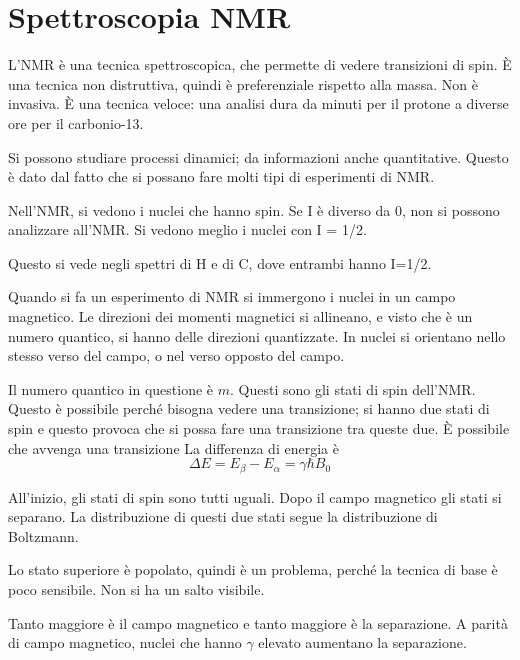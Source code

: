 \chapter{Spettroscopia NMR}

L'NMR è una tecnica spettroscopica, che permette di vedere transizioni di spin. È una tecnica non distruttiva,
quindi è preferenziale rispetto alla massa. Non è invasiva. È una
tecnica veloce: una analisi dura da minuti per il protone a diverse ore per il carbonio-13.

Si possono studiare processi dinamici; da informazioni anche
quantitative. Questo è dato dal fatto che si possano fare molti tipi di
esperimenti di NMR.


Nell'NMR, si vedono i nuclei che hanno spin. Se I è diverso da 0, non si
possono analizzare all'NMR. Si vedono meglio i nuclei con I = 1/2.

Questo si vede negli spettri di H e di C, dove entrambi hanno I=1/2.


Quando si fa un esperimento di NMR si immergono i nuclei in un campo
magnetico. Le direzioni dei momenti magnetici si allineano, e visto che
è un numero quantico, si hanno delle direzioni quantizzate.
In nuclei si orientano nello stesso verso del campo, o nel verso opposto del
campo.


Il numero quantico in questione è $m$. Questi sono gli stati di spin
dell'NMR. Questo è possibile perché bisogna vedere una transizione; si
hanno due stati di spin e questo provoca che si possa fare una
transizione tra queste due. È possibile che avvenga una transizione
La differenza di energia è
\[
\Delta E = E_\beta - E_\alpha = \gamma \hbar B_0
\]

All'inizio, gli stati di spin sono tutti uguali. Dopo il campo magnetico
gli stati si separano. La distribuzione di questi due stati segue la
distribuzione di Boltzmann.

Lo stato superiore è popolato, quindi è un problema, perché la tecnica
di base è poco sensibile. Non si ha un salto visibile.

Tanto maggiore è il campo magnetico e tanto maggiore è la separazione. A
parità di campo magnetico, nuclei che hanno \(\gamma\) elevato aumentano
la separazione.

